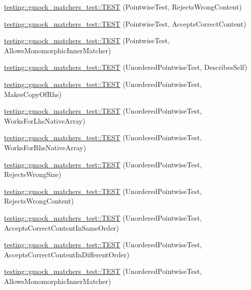\begin{DoxyCompactItemize}
\item 
\hyperlink{namespacetesting_1_1gmock__matchers__test_a135ad7162da91c9a234193fbbe5ef775}{testing\+::gmock\+\_\+matchers\+\_\+test\+::\+T\+E\+ST} (Pointwise\+Test, Rejects\+Wrong\+Content)
\item 
\hyperlink{namespacetesting_1_1gmock__matchers__test_a42b98b370f1897cecfafbbfba53f4f38}{testing\+::gmock\+\_\+matchers\+\_\+test\+::\+T\+E\+ST} (Pointwise\+Test, Accepts\+Correct\+Content)
\item 
\hyperlink{namespacetesting_1_1gmock__matchers__test_a9bbef6d651166c37af32c54923bcd849}{testing\+::gmock\+\_\+matchers\+\_\+test\+::\+T\+E\+ST} (Pointwise\+Test, Allows\+Monomorphic\+Inner\+Matcher)
\item 
\hyperlink{namespacetesting_1_1gmock__matchers__test_af3307f88a321331155a146d49974e3e3}{testing\+::gmock\+\_\+matchers\+\_\+test\+::\+T\+E\+ST} (Unordered\+Pointwise\+Test, Describes\+Self)
\item 
\hyperlink{namespacetesting_1_1gmock__matchers__test_a05e9bbee9d19692f45a846c2ff45e016}{testing\+::gmock\+\_\+matchers\+\_\+test\+::\+T\+E\+ST} (Unordered\+Pointwise\+Test, Makes\+Copy\+Of\+Rhs)
\item 
\hyperlink{namespacetesting_1_1gmock__matchers__test_a57e330a5ae600f65d4daa2ed57bbc887}{testing\+::gmock\+\_\+matchers\+\_\+test\+::\+T\+E\+ST} (Unordered\+Pointwise\+Test, Works\+For\+Lhs\+Native\+Array)
\item 
\hyperlink{namespacetesting_1_1gmock__matchers__test_ae75a933b86db4c43a7bec2ffa97692ef}{testing\+::gmock\+\_\+matchers\+\_\+test\+::\+T\+E\+ST} (Unordered\+Pointwise\+Test, Works\+For\+Rhs\+Native\+Array)
\item 
\hyperlink{namespacetesting_1_1gmock__matchers__test_a50412d02c70f8303a087e6832d26ba62}{testing\+::gmock\+\_\+matchers\+\_\+test\+::\+T\+E\+ST} (Unordered\+Pointwise\+Test, Rejects\+Wrong\+Size)
\item 
\hyperlink{namespacetesting_1_1gmock__matchers__test_a9a9a85c6598ab74463703acbd01aa1a7}{testing\+::gmock\+\_\+matchers\+\_\+test\+::\+T\+E\+ST} (Unordered\+Pointwise\+Test, Rejects\+Wrong\+Content)
\item 
\hyperlink{namespacetesting_1_1gmock__matchers__test_aa68bf48e4a8fa41fcd60f59cc60ede8f}{testing\+::gmock\+\_\+matchers\+\_\+test\+::\+T\+E\+ST} (Unordered\+Pointwise\+Test, Accepts\+Correct\+Content\+In\+Same\+Order)
\item 
\hyperlink{namespacetesting_1_1gmock__matchers__test_a3d48732b4a6069cfcf5c0dde6027dad5}{testing\+::gmock\+\_\+matchers\+\_\+test\+::\+T\+E\+ST} (Unordered\+Pointwise\+Test, Accepts\+Correct\+Content\+In\+Different\+Order)
\item 
\hyperlink{namespacetesting_1_1gmock__matchers__test_af16d28a9f3a07b8ef2962b868b4f8399}{testing\+::gmock\+\_\+matchers\+\_\+test\+::\+T\+E\+ST} (Unordered\+Pointwise\+Test, Allows\+Monomorphic\+Inner\+Matcher)
\end{DoxyCompactItemize}
